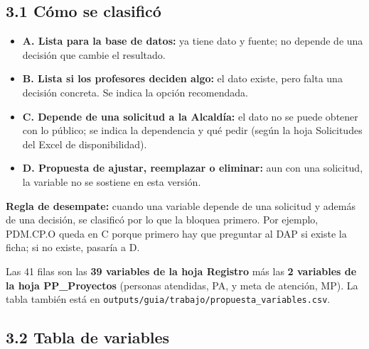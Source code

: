 \documentclass[11pt,letterpaper]{article}
\newcommand{\pagsize}{\special{papersize=21.59cm,27.94cm}}
\begin{document}
\subsection*{3.1 Cómo se clasificó}


\begin{itemize}
\item \textbf{A. Lista para la base de datos:} ya tiene dato y fuente; no depende de una decisión que cambie el resultado.
\item \textbf{B. Lista si los profesores deciden algo:} el dato existe, pero falta una decisión concreta. Se indica la opción recomendada.
\item \textbf{C. Depende de una solicitud a la Alcaldía:} el dato no se puede obtener con lo público; se indica la dependencia y qué pedir (según la hoja Solicitudes del Excel de disponibilidad).
\item \textbf{D. Propuesta de ajustar, reemplazar o eliminar:} aun con una solicitud, la variable no se sostiene en esta versión.
\end{itemize}

\textbf{Regla de desempate:} cuando una variable depende de una solicitud y además de una decisión, se clasificó por lo que la bloquea primero. Por ejemplo, PDM.CP.O queda en C porque primero hay que preguntar al DAP si existe la ficha; si no existe, pasaría a D.

Las 41 filas son las \textbf{39 variables de la hoja Registro} más las \textbf{2 variables de la hoja PP\_Proyectos} (personas atendidas, PA, y meta de atención, MP). La tabla también está en \texttt{\footnotesize outputs/\allowbreak{}guia/\allowbreak{}trabajo/\allowbreak{}propuesta\_\allowbreak{}variables.\allowbreak{}csv}.

\clearpage
{}
\setlength{\headwidth}{\textwidth}
\renewcommand{\pagsize}{\special{papersize=27.94cm,21.59cm}}

\subsection*{3.2 Tabla de variables}


\par{}\smallskip
\end{document}
